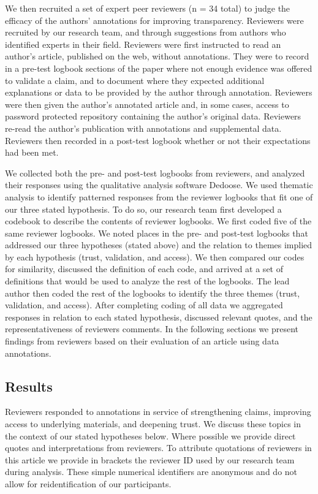 \documentclass[sigchi]{acmart}
\begin{document}
We then recruited a set of expert peer reviewers (n = 34 total) to judge the efficacy of the authors' annotations for improving transparency. Reviewers were recruited by our research team, and through suggestions from authors who identified experts in their field. Reviewers were first instructed to read an author’s article, published on the web, without annotations. They were to record in a pre-test logbook sections of the paper where not enough evidence was offered to validate a claim, and to document where they expected additional explanations or data to be provided by the author through annotation. Reviewers were then given the author’s annotated article and, in some cases, access to password protected repository containing the author’s original data. Reviewers re-read the author’s publication with annotations and supplemental data. Reviewers then recorded in a post-test logbook whether or not their expectations had been met. 

We collected both the pre- and post-test logbooks from reviewers, and analyzed their responses using the qualitative analysis software Dedoose. We used thematic analysis \cite{braun2006using} to identify patterned responses from the reviewer logbooks that fit one of our three stated hypothesis. To do so, our research team first developed a codebook to describe the contents of reviewer logbooks. We first coded five of the same reviewer logbooks. We noted places in the pre- and post-test logbooks that addressed our three hypotheses (stated above) and the relation to themes implied by each hypothesis (trust, validation, and access). We then compared our codes for similarity, discussed the definition of each code, and arrived at a set of definitions that would be used to analyze the rest of the logbooks. The lead author then coded the rest of the logbooks to identify the three themes (trust, validation, and access). After completing coding of all data we aggregated responses in relation to each stated hypothesis, discussed relevant quotes, and the representativeness of reviewers comments. In the following sections we present findings from reviewers based on their evaluation of an article using data annotations. 

\subsection{Results}
Reviewers responded to annotations in service of strengthening claims, improving access to underlying materials, and deepening trust. We discuss these topics in the context of our stated hypotheses below. Where possible we provide direct quotes and interpretations from reviewers. To attribute quotations of reviewers in this article we provide in brackets the reviewer ID used by our research team during analysis. These simple numerical identifiers are anonymous and do not allow for reidentification of our participants.\\ 
\end{document}

